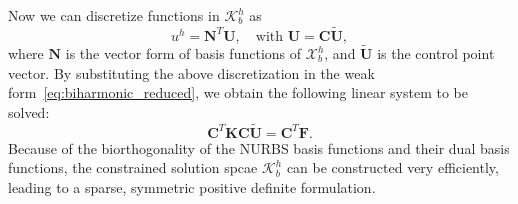 \documentclass[preprint,12pt]{elsarticle}
\theoremstyle{remark}
\begin{document}
Now we can discretize functions in $\mathcal{K}_b^h$ as
\begin{equation}
    u^h=\mathbf{N}^T\mathbf{U},\quad\text{with }\mathbf{U}=\mathbf{C}\tilde{\mathbf{U}},
\end{equation}
where $\mathbf{N}$ is the vector form of basis functions of $\mathcal{X}_b^h$, and $\tilde{\mathbf{U}}$ is the control point vector. By substituting the above discretization in the weak form~\eqref{eq:biharmonic_reduced}, we obtain the following linear system to be solved:
\begin{equation}
    \mathbf{C}^T\mathbf{K}\mathbf{C}\tilde{\mathbf{U}}=\mathbf{C}^T\mathbf{F}.
\end{equation}
Because of the biorthogonality of the NURBS basis functions and their dual basis functions, the constrained solution spcae $\mathcal{K}_b^h$ can be constructed very efficiently, leading to a sparse, symmetric positive definite formulation.
\end{document}
